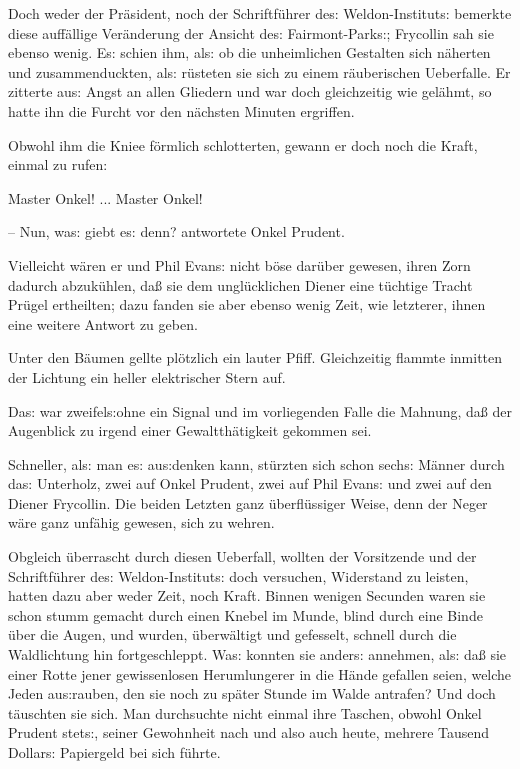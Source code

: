 \documentclass[oneside,12pt]{book}
\newcommand{\s}{s:}
\begin{document}
Doch weder der Pr\"asident, noch der Schriftf\"uhrer de{\s}
Weldon-Institut{\s} bemerkte diese auf\/f\"allige Ver\"anderung der
Ansicht de{\s} Fairmont-Park{\s}; Frycollin sah sie ebenso wenig.
E{\s} schien ihm, al{\s} ob die unheimlichen Gestalten sich
n\"aherten und zusammenduckten, al{\s} r\"usteten sie sich zu einem
r\"auberischen Ueberfalle. Er zitterte au{\s} Angst an allen Gliedern
und war doch gleichzeitig wie gel\"ahmt, so hatte ihn die Furcht vor
den n\"achsten Minuten ergriffen.

Obwohl ihm die Kniee f\"ormlich schlotterten, gewann er doch noch die
Kraft, einmal zu rufen:

{\glqq}Master Onkel! ... Master Onkel!

-- Nun, wa{\s} giebt e{\s} denn?{\grqq} antwortete Onkel Prudent.

Vielleicht w\"aren er und Phil Evan{\s} nicht b\"ose dar\"uber
gewesen, ihren Zorn dadurch abzuk\"uhlen, da{\ss} sie dem
ungl\"ucklichen Diener eine t\"uchtige Tracht Pr\"ugel ertheilten;
dazu fanden sie aber ebenso wenig Zeit, wie letzterer, ihnen eine
weitere Antwort zu geben.

Unter den B\"aumen gellte pl\"otzlich ein lauter Pfiff. Gleichzeitig
flammte inmitten der Lichtung ein heller elektrischer Stern auf.

Da{\s} war zweifel{\s}ohne ein Signal und im vorliegenden Falle die
Mahnung, da{\ss} der Augenblick zu irgend einer Gewaltth\"atigkeit
gekommen sei.

Schneller, al{\s} man e{\s} au{\s}denken kann, st\"urzten sich schon
sech{\s} M\"anner durch da{\s} Unterholz, zwei auf Onkel Prudent,
zwei auf Phil Evan{\s} und zwei auf den Diener Frycollin. Die beiden
Letzten ganz \"uberfl\"ussiger Weise, denn der Neger w\"are ganz
unf\"ahig gewesen, sich zu wehren.

Obgleich \"uberrascht durch diesen Ueberfall, wollten der Vorsitzende
und der Schriftf\"uhrer de{\s} Weldon-Institut{\s} doch versuchen,
Widerstand zu leisten, hatten dazu aber weder Zeit, noch Kraft.
Binnen wenigen Secunden waren sie schon stumm gemacht durch einen
Knebel im Munde, blind durch eine Binde \"uber die Augen, und wurden,
\"uberw\"altigt und gefesselt, schnell durch die Waldlichtung hin
fortgeschleppt. Wa{\s} konnten sie ander{\s} annehmen, al{\s} da{\ss}
sie einer Rotte jener gewissenlosen Herumlungerer in die H\"ande
gefallen seien, welche Jeden au{\s}rauben, den sie noch zu sp\"ater
Stunde im Walde antrafen? Und doch t\"auschten sie sich. Man
durchsuchte nicht einmal ihre Taschen, obwohl Onkel Prudent stet{\s},
seiner Gewohnheit nach und also auch heute, mehrere Tausend
Dollar{\s} Papiergeld bei sich f\"uhrte.
\end{document}
